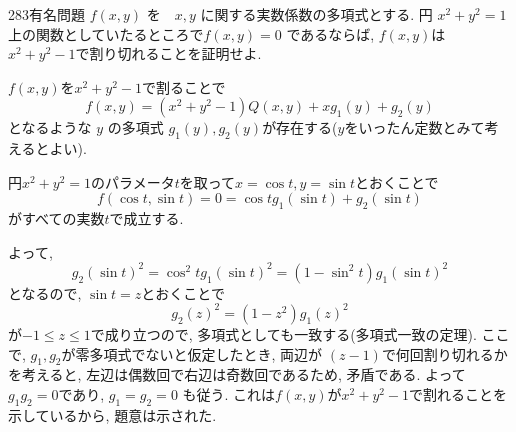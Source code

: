\begin{prob}{283}{}{有名問題}
$f(x,y)$ を　$x,y$ に関する実数係数の多項式とする. 円 $x^2 + y^2 = 1$ 上の関数としていたるところで$f(x,y) = 0$ であるならば, $f(x,y)$は$x^2 + y^2 - 1$で割り切れることを証明せよ. 
\end{prob}

$f(x,y)$を$x^2 + y^2 - 1$で割ることで
$$
f(x,y) = (x^2 + y^2 - 1)Q(x,y) + xg_1(y) +  g_2(y)
$$
となるような $y$ の多項式 $g_1(y), g_2(y)$が存在する($y$をいったん定数とみて考えるとよい).

円$x^2 + y^2 = 1$のパラメータ$t$を取って$x=\cos{t}, y=\sin{t}$とおくことで
$$
f(\cos{t}, \sin{t}) = 0 = \cos{t}g_1(\sin{t}) + g_2(\sin{t})
$$ 
がすべての実数$t$で成立する. 

よって, 
$$
g_2(\sin{t})^2 = \cos^{2}{t}g_1(\sin{t})^2 = (1-\sin^{2}{t})g_1(\sin{t})^2 
$$
となるので, $\sin{t} = z$とおくことで
$$
g_2(z)^2 = (1-z^2)g_1(z)^2
$$
が$-1\leq z\leq 1$で成り立つので, 多項式としても一致する(多項式一致の定理). ここで, $g_1, g_2$が零多項式でないと仮定したとき, 両辺が $(z-1)$で何回割り切れるかを考えると, 左辺は偶数回で右辺は奇数回であるため, 矛盾である. よって$g_1g_2 = 0$であり, $g_1 = g_2 = 0$ も従う. これは$f(x,y)$が$x^2 + y^2 - 1$で割れることを示しているから, 題意は示された. 